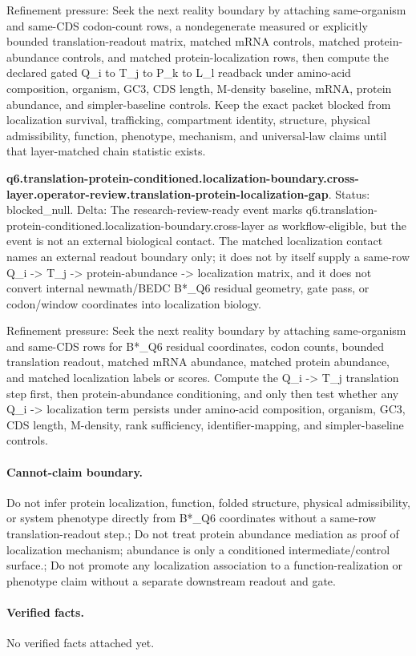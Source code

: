Refinement pressure: Seek the next reality boundary by attaching same-organism and same-CDS codon-count rows, a nondegenerate measured or explicitly bounded translation-readout matrix, matched mRNA controls, matched protein-abundance controls, and matched protein-localization rows, then compute the declared gated Q\_i to T\_j to P\_k to L\_l readback under amino-acid composition, organism, GC3, CDS length, M-density baseline, mRNA, protein abundance, and simpler-baseline controls. Keep the exact packet blocked from localization survival, trafficking, compartment identity, structure, physical admissibility, function, phenotype, mechanism, and universal-law claims until that layer-matched chain statistic exists.

\textbf{q6.translation-protein-conditioned.localization-boundary.cross-layer.operator-review.translation-protein-localization-gap}. Status: blocked\_null. Delta: The research-review-ready event marks q6.translation-protein-conditioned.localization-boundary.cross-layer as workflow-eligible, but the event is not an external biological contact. The matched localization contact names an external readout boundary only; it does not by itself supply a same-row Q\_i -> T\_j -> protein-abundance -> localization matrix, and it does not convert internal newmath/BEDC B*\_Q6 residual geometry, gate pass, or codon/window coordinates into localization biology.

Refinement pressure: Seek the next reality boundary by attaching same-organism and same-CDS rows for B*\_Q6 residual coordinates, codon counts, bounded translation readout, matched mRNA abundance, matched protein abundance, and matched localization labels or scores. Compute the Q\_i -> T\_j translation step first, then protein-abundance conditioning, and only then test whether any Q\_i -> localization term persists under amino-acid composition, organism, GC3, CDS length, M-density, rank sufficiency, identifier-mapping, and simpler-baseline controls.

\paragraph{Cannot-claim boundary.} Do not infer protein localization, function, folded structure, physical admissibility, or system phenotype directly from B*\_Q6 coordinates without a same-row translation-readout step.; Do not treat protein abundance mediation as proof of localization mechanism; abundance is only a conditioned intermediate/control surface.; Do not promote any localization association to a function-realization or phenotype claim without a separate downstream readout and gate.

\paragraph{Verified facts.}
No verified facts attached yet.
